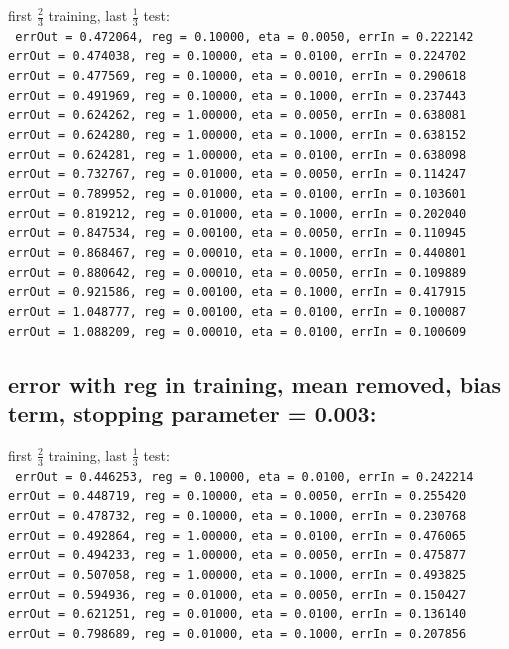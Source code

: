 \begin{appendices}
\noindent first $\frac{2}{3}$ training, last $\frac{1}{3}$ test: \\
\texttt{
  errOut = 0.472064, reg = 0.10000, eta = 0.0050, errIn = 0.222142 \\
  errOut = 0.474038, reg = 0.10000, eta = 0.0100, errIn = 0.224702 \\
  errOut = 0.477569, reg = 0.10000, eta = 0.0010, errIn = 0.290618 \\
  errOut = 0.491969, reg = 0.10000, eta = 0.1000, errIn = 0.237443 \\
  errOut = 0.624262, reg = 1.00000, eta = 0.0050, errIn = 0.638081 \\
  errOut = 0.624280, reg = 1.00000, eta = 0.1000, errIn = 0.638152 \\
  errOut = 0.624281, reg = 1.00000, eta = 0.0100, errIn = 0.638098 \\
  errOut = 0.732767, reg = 0.01000, eta = 0.0050, errIn = 0.114247 \\
  errOut = 0.789952, reg = 0.01000, eta = 0.0100, errIn = 0.103601 \\
  errOut = 0.819212, reg = 0.01000, eta = 0.1000, errIn = 0.202040 \\
  errOut = 0.847534, reg = 0.00100, eta = 0.0050, errIn = 0.110945 \\
  errOut = 0.868467, reg = 0.00010, eta = 0.1000, errIn = 0.440801 \\
  errOut = 0.880642, reg = 0.00010, eta = 0.0050, errIn = 0.109889 \\
  errOut = 0.921586, reg = 0.00100, eta = 0.1000, errIn = 0.417915 \\
  errOut = 1.048777, reg = 0.00100, eta = 0.0100, errIn = 0.100087 \\
  errOut = 1.088209, reg = 0.00010, eta = 0.0100, errIn = 0.100609
}

\subsection{error with reg in training, mean removed, bias term, stopping parameter = 0.003:}

\noindent first $\frac{2}{3}$ training, last $\frac{1}{3}$ test: \\
\texttt{
  errOut = 0.446253, reg = 0.10000, eta = 0.0100, errIn = 0.242214 \\
  errOut = 0.448719, reg = 0.10000, eta = 0.0050, errIn = 0.255420 \\
  errOut = 0.478732, reg = 0.10000, eta = 0.1000, errIn = 0.230768 \\
  errOut = 0.492864, reg = 1.00000, eta = 0.0100, errIn = 0.476065 \\
  errOut = 0.494233, reg = 1.00000, eta = 0.0050, errIn = 0.475877 \\
  errOut = 0.507058, reg = 1.00000, eta = 0.1000, errIn = 0.493825 \\
  errOut = 0.594936, reg = 0.01000, eta = 0.0050, errIn = 0.150427 \\
  errOut = 0.621251, reg = 0.01000, eta = 0.0100, errIn = 0.136140 \\
  errOut = 0.798689, reg = 0.01000, eta = 0.1000, errIn = 0.207856
}



\end{appendices}
